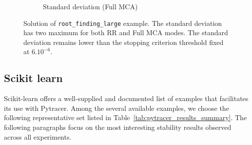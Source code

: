 \documentclass[11pt]{article}
\newcommand{\tristan}[1]{\color{orange}\textbf{From Tristan:} #1\color{black}\xspace}
\begin{document}
\begin{figure}
\begin{subfigure}{0.45\linewidth}
    \caption{Standard deviation (Full MCA)}
    \label{fig:stdev_mca}
    \end{subfigure}
    \caption{Solution of \texttt{root\_finding\_large} example. 
    The standard deviation has two maximum for both RR and Full MCA modes. The standard deviation remains lower than
    the stopping criterion threshold fixed at $6.10^{-6}$. }
    \label{fig:root_finding_large}
\end{figure}



\subsection{Scikit learn}
\label{sec:sklearn_tests}

Scikit-learn offers a well-supplied and documented list of examples 
that facilitates its use with Pytracer.
Among the several available examples, we choose the following representative set
listed in Table~\ref{tab:pytracer_results_summary}. The following paragraphs 
focus on the most interesting stability results observed across all experiments.
\end{document}
